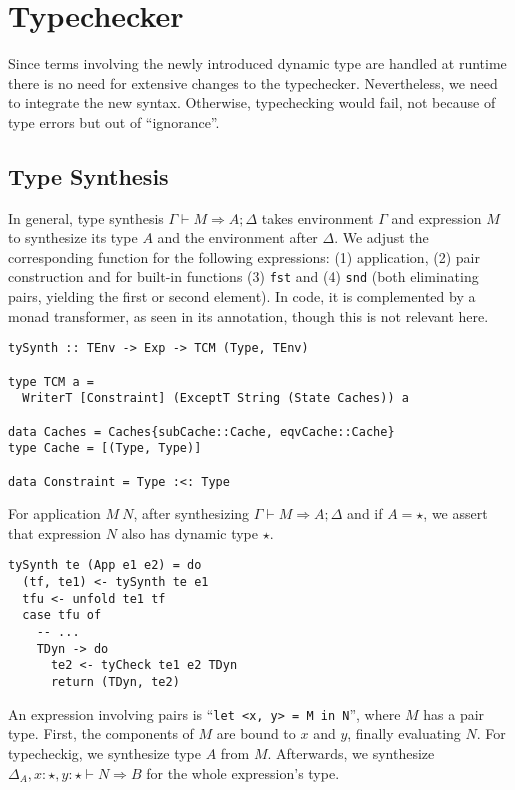 \section{Typechecker}

Since terms involving the newly introduced dynamic type are handled at runtime there is no need for extensive changes to the typechecker. Nevertheless, we need to integrate the new syntax. Otherwise, typechecking would fail, not because of type errors but out of ``ignorance''.

\subsection{Type Synthesis}

In general, type synthesis $\Gamma \vdash M \Rightarrow A;\Delta$ takes environment $\Gamma$ and expression $M$ to synthesize its type $A$ and the environment after $\Delta$. We adjust the corresponding function for the following expressions: (1) application, (2) pair construction and for built-in functions (3) \texttt{fst} and (4) \texttt{snd} (both eliminating pairs, yielding the first or second element). In code, it is complemented by a monad transformer, as seen in its annotation, though this is not relevant here.

\begin{lstlisting}[caption=\texttt{tySynth} function type annotation]
tySynth :: TEnv -> Exp -> TCM (Type, TEnv)

type TCM a =
  WriterT [Constraint] (ExceptT String (State Caches)) a

data Caches = Caches{subCache::Cache, eqvCache::Cache}
type Cache = [(Type, Type)]

data Constraint = Type :<: Type
\end{lstlisting}

For application $M~N$, after synthesizing $\Gamma \vdash M \Rightarrow A;\Delta$ and if $A = \star$, we assert that expression $N$ also has dynamic type $\star$.

\begin{lstlisting}[caption=Application type synthesis (\texttt{TCTyping.hs})]
tySynth te (App e1 e2) = do
  (tf, te1) <- tySynth te e1
  tfu <- unfold te1 tf
  case tfu of
    -- ...
    TDyn -> do
      te2 <- tyCheck te1 e2 TDyn
      return (TDyn, te2)
\end{lstlisting}

An expression involving pairs is ``\lstinline[language=ldgv]!let <x, y> = M in N!'', where $M$ has a pair type. First, the components of $M$ are bound to $x$ and $y$, finally evaluating $N$. For typecheckig, we synthesize type $A$ from $M$. Afterwards, we synthesize $\Delta_A, x:\star, y:\star \vdash N \Rightarrow B$ for the whole expression's type.

